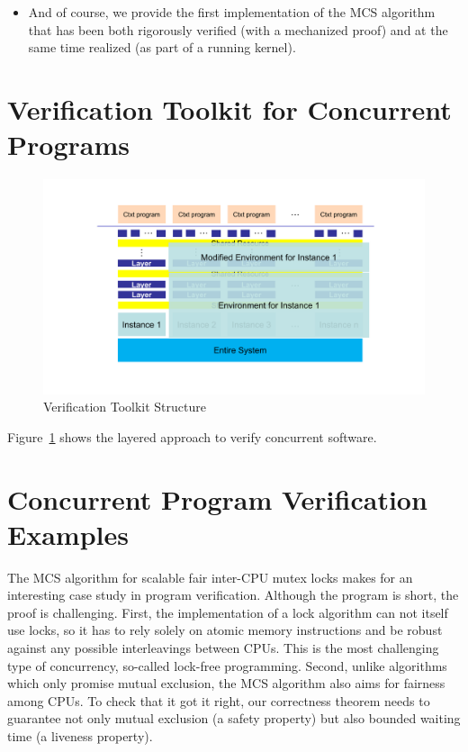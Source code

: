 {\begin{itemize}
\item And of course, we provide the first implementation of the MCS algorithm that has been both rigorously verified (with a mechanized proof) and at the same time realized (as part of a running kernel).
\end{itemize}




\section{Verification Toolkit for Concurrent Programs}
\label{chapter:introduction:sec:verification-toolkit-for-concurrent-programs}

\begin{figure}
\includegraphics[width=\textwidth]{figs/intro}
\caption{Verification Toolkit Structure}
\label{chapter:intro:verification-toolkit-structure} 
\end{figure}

Figure~\ref{chapter:intro:verification-toolkit-structure}  shows
the layered approach to verify concurrent  software.



\section{Concurrent Program Verification Examples}
\label{chapter:introduction:sec:concurrent-program-verification-examples}


The MCS algorithm for scalable fair inter-CPU mutex locks makes for an interesting case study in program verification.
Although the program is short, the proof is challenging.
First, the implementation of a lock algorithm can not itself use locks, so it has to rely solely on atomic memory instructions and be robust against any possible interleavings between CPUs. This is the most challenging type of concurrency, so-called lock-free programming.
Second, unlike algorithms which only promise mutual exclusion, the MCS algorithm also aims for fairness among CPUs. To check that it got it right, our correctness theorem needs to guarantee not only mutual exclusion (a safety property) but also bounded waiting time (a liveness property).

}
